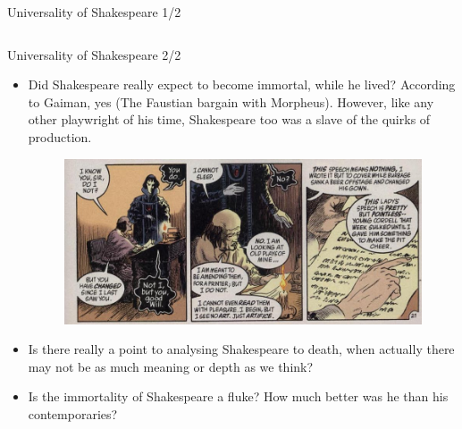 \documentclass{beamer}
\begin{document}
\begin{frame}{Universality of Shakespeare 1/2}
\begin{columns}[c]
    \end{columns}
  \end{frame}

  \begin{frame}{Universality of Shakespeare 2/2}
    \begin{itemize}
      \item Did Shakespeare really expect to become immortal, while he lived? According to Gaiman, yes (The Faustian bargain with Morpheus). However, like any other playwright of his time, Shakespeare too was a slave of the quirks of production. 
      \begin{figure}[htp]
        \begin{center}
          \centering
          \includegraphics[scale=0.32]{../Presentation/routine.jpg}
        \end{center}
      \end{figure}

    \item Is there really a point to analysing Shakespeare to death, when actually there may not be as much meaning or depth as we think?
      
    \item Is the immortality of Shakespeare a fluke? How much better was he than his contemporaries?
    \end{itemize}
  \end{frame}
\end{document}
